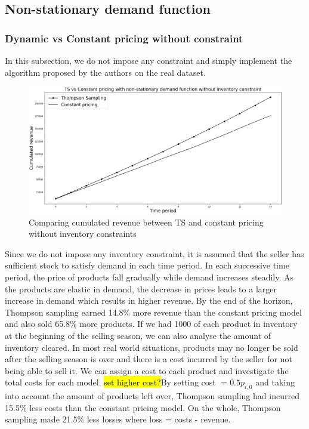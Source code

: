 \documentclass[a4paper]{article}
\begin{document}
\subsection{Non-stationary demand function}
\subsubsection{Dynamic vs Constant pricing without constraint}
In this subsection, we do not impose any constraint and simply implement the algorithm proposed by the authors on the real dataset.
\begin{figure}[h]
	\centering
	\includegraphics[width=1.03\textwidth]{2.png}
	\caption{\label{fig:four}Comparing cumulated revenue between TS and constant pricing without inventory constraints}
\end{figure}
\newline
Since we do not impose any inventory constraint, it is assumed that the seller has sufficient stock to satisfy demand in each time period. In each successive time period, the price of products fall gradually while demand increases steadily. As the products are elastic in demand, the decrease in prices leads to a larger increase in demand which results in higher revenue.
\newline
\newline
By the end of the horizon, Thompson sampling earned 14.8\% more revenue than the constant pricing model and also sold 65.8\% more products. If we had 1000 of each product in inventory at the beginning of the selling season, we can also analyse the amount of inventory cleared. In most real world situations, products may no longer be sold after the selling season is over and there is a cost incurred by the seller for not being able to sell it. We can assign a cost to each product and investigate the total costs for each model. \hl{set higher cost?}By setting cost $= 0.5  p_{i,0}$ and taking into account the amount of products left over, Thompson sampling had incurred 15.5\% less costs than the constant pricing model. On the whole, Thompson sampling made 21.5\% less losses where loss = costs - revenue.
\end{document}
